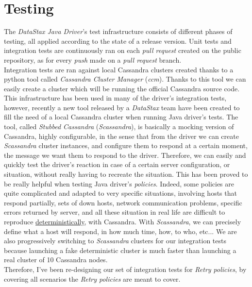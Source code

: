 \documentclass[a4paper]{report}
\newcommand{\ds}{\emph{DataStax\xspace}}
\newcommand{\djd}{\emph{DataStax Java Driver\xspace}}
\begin{document}
\section{Testing}
The \djd{}'s test infrastructure consists of different phases of testing, all applied according to the state of a release version. Unit tests and integration tests are continuously ran on each \emph{pull request} created on the public repository, as for every \emph{push} made on a \emph{pull request} branch.\\
Integration tests are ran against local Cassandra clusters created thanks to a python tool called \emph{Cassandra Cluster Manager} (\emph{ccm}). Thanks to this tool we can easily create a cluster which will be running the official Cassandra source code. This infrastructure has been used in many of the driver's integration tests, however, recently a new tool released by a \ds{} team have been created to fill the need of a local Cassandra cluster when running Java driver's tests. The tool, called \emph{Stubbed Cassandra} (\emph{Scassandra}), is basically a mocking version of Cassandra, highly configurable, in the sense that from the driver we can create \emph{Scassandra} cluster instances, and configure them to respond at a certain moment, the message we want them to respond to the driver. Therefore, we can easily and quickly test the driver's reaction in case of a certain server configuration, or situation, without really having to recreate the situation. This has been proved to be really helpful when testing Java driver's \emph{policies}. Indeed, some policies are quite complicated and adapted to very specific situations, involving hosts that respond partially, sets of down hosts, network communication problems, specific errors returned by server, and all these situation in real life are difficult to reproduce \underline{deterministically}, with Cassandra. With \emph{Scassandra}, we can precisely define what a host will respond, in how much time, how, to who, etc... We are also progressively switching to \emph{Scassandra} clusters for our integration tests because launching a fake deterministic cluster is much faster than launching a real cluster of 10 Cassandra nodes.\\
Therefore, I've been re-designing our set of integration tests for \emph{Retry policies}, by covering all scenarios the \emph{Retry policies} are meant to cover.
\end{document}

